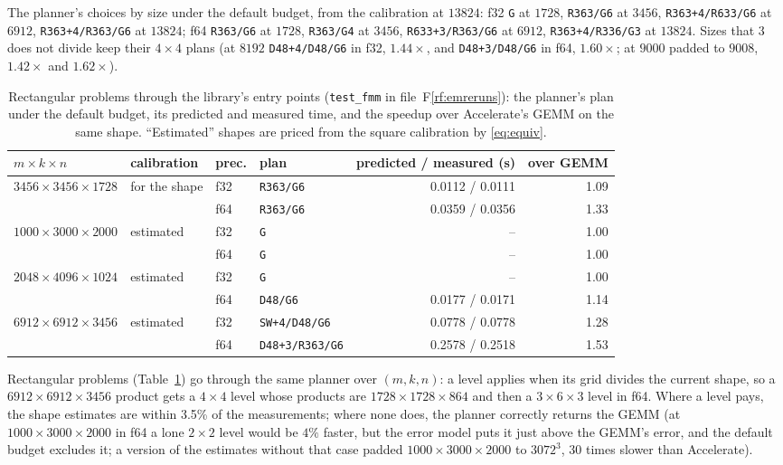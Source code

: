 \documentclass[11pt]{article}
\newcommand{\rf}[1]{F\ref{rf:#1}}
\newcommand{\lv}[1]{\texttt{#1}}
\begin{document}
The planner's choices by size under the default budget, from the calibration
at $13824$: f32 \lv{G} at $1728$, \lv{R363/G6} at $3456$,
\lv{R363+4/R633/G6} at $6912$, \lv{R363+4/R363/G6} at $13824$; f64
\lv{R363/G6} at $1728$, \lv{R363/G4} at $3456$, \lv{R633+3/R363/G6} at
$6912$, \lv{R363+4/R336/G3} at $13824$.  Sizes that $3$ does not divide keep
their $4\times4$ plans (at $8192$ \lv{D48+4/D48/G6} in f32, $1.44\times$, and
\lv{D48+3/D48/G6} in f64, $1.60\times$; at $9000$ padded to $9008$, $1.42\times$ and
$1.62\times$).

\begin{table}[!b]
\centering\small
\begin{tabular}{llllrr}
\toprule
$m\times k\times n$ & calibration & prec. & plan & predicted / measured (s) & over GEMM\\
\midrule
$3456\times3456\times1728$ & for the shape & f32 & \lv{R363/G6} & 0.0112 / 0.0111 & 1.09\\
 & & f64 & \lv{R363/G6} & 0.0359 / 0.0356 & 1.33\\
$1000\times3000\times2000$ & estimated & f32 & \lv{G} & -- & 1.00\\
 & & f64 & \lv{G} & -- & 1.00\\
$2048\times4096\times1024$ & estimated & f32 & \lv{G} & -- & 1.00\\
 & & f64 & \lv{D48/G6} & 0.0177 / 0.0171 & 1.14\\
$6912\times6912\times3456$ & estimated & f32 & \lv{SW+4/D48/G6} & 0.0778 / 0.0778 & 1.28\\
 & & f64 & \lv{D48+3/R363/G6} & 0.2578 / 0.2518 & 1.53\\
\bottomrule
\end{tabular}
\caption{Rectangular problems through the library's entry points
(\texttt{test\_fmm} in file~\rf{emreruns}): the planner's plan under the default budget, its predicted
and measured time, and the speedup over Accelerate's GEMM on the same shape.
``Estimated'' shapes are priced from the square calibration by
\eqref{eq:equiv}.}
\label{tab:rect}
\end{table}

Rectangular problems (Table~\ref{tab:rect}) go through the same planner over
$(m,k,n)$: a level applies when its grid divides the current shape, so a
$6912\times6912\times3456$ product gets a $4\times4$ level whose products are
$1728\times1728\times864$ and then a $3\times6\times3$ level in f64.  Where a
level pays, the shape estimates are within 3.5\% of the measurements; where none does, the planner correctly returns the GEMM (at $1000\times3000\times2000$ in f64 a lone $2\times2$ level would be $4\%$ faster, but the error model puts it just above the GEMM's error, and the default budget excludes it; a
version of the estimates without that case padded $1000\times3000\times2000$
to $3072^3$, 30 times slower than Accelerate).
\end{document}
